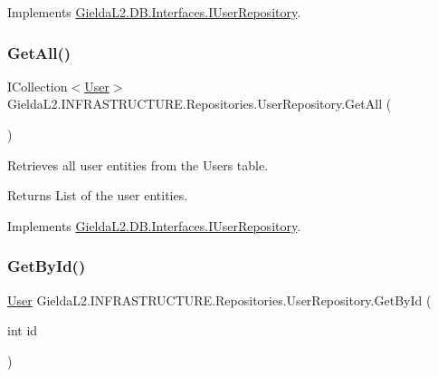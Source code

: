 Implements \mbox{\hyperlink{interface_gielda_l2_1_1_d_b_1_1_interfaces_1_1_i_user_repository_a65d2dc63fea742354209b2e13a15a452}{Gielda\+L2.\+D\+B.\+Interfaces.\+I\+User\+Repository}}.

\mbox{\label{class_gielda_l2_1_1_i_n_f_r_a_s_t_r_u_c_t_u_r_e_1_1_repositories_1_1_user_repository_ab9a56b5b0dfe9cf6350eebcf751adcfc}} 
\subsubsection{\texorpdfstring{GetAll()}{GetAll()}}
{\footnotesize\ttfamily I\+Collection$<$\mbox{\hyperlink{class_gielda_l2_1_1_d_b_1_1_entities_1_1_user}{User}}$>$ Gielda\+L2.\+I\+N\+F\+R\+A\+S\+T\+R\+U\+C\+T\+U\+R\+E.\+Repositories.\+User\+Repository.\+Get\+All (\begin{DoxyParamCaption}{ }\end{DoxyParamCaption})}



Retrieves all user entities from the Users table. 

\begin{DoxyReturn}{Returns}
List of the user entities.
\end{DoxyReturn}


Implements \mbox{\hyperlink{interface_gielda_l2_1_1_d_b_1_1_interfaces_1_1_i_user_repository_ada0fb28a6665ffc0191086563dbeb28e}{Gielda\+L2.\+D\+B.\+Interfaces.\+I\+User\+Repository}}.

\mbox{\label{class_gielda_l2_1_1_i_n_f_r_a_s_t_r_u_c_t_u_r_e_1_1_repositories_1_1_user_repository_a59783783c8210efff03a749d4f63fadf}} 
\subsubsection{\texorpdfstring{GetById()}{GetById()}}
{\footnotesize\ttfamily \mbox{\hyperlink{class_gielda_l2_1_1_d_b_1_1_entities_1_1_user}{User}} Gielda\+L2.\+I\+N\+F\+R\+A\+S\+T\+R\+U\+C\+T\+U\+R\+E.\+Repositories.\+User\+Repository.\+Get\+By\+Id (\begin{DoxyParamCaption}\item[{int}]{id }\end{DoxyParamCaption})}



